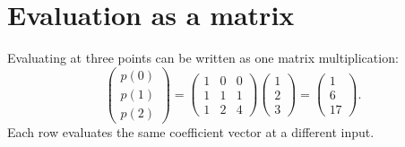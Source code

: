 \documentclass[11pt]{article}
\begin{document}
\section{Evaluation as a matrix}
Evaluating at three points can be written as one matrix multiplication:
\[
\begin{pmatrix}
p(0) \\ p(1) \\ p(2)
\end{pmatrix}
=
\begin{pmatrix}
1 & 0 & 0 \\
1 & 1 & 1 \\
1 & 2 & 4
\end{pmatrix}
\begin{pmatrix} 1 \\ 2 \\ 3 \end{pmatrix}
=
\begin{pmatrix} 1 \\ 6 \\ 17 \end{pmatrix}.
\]
Each row evaluates the same coefficient vector at a different input.
\end{document}

